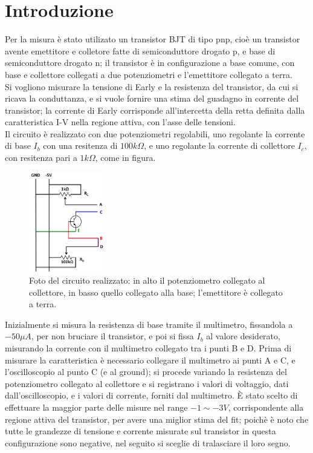 \documentclass{article}
\begin{document}
\section{Introduzione}
Per la misura è stato utilizato un transistor BJT di tipo pnp, cioè un transistor avente emettitore e colletore fatte di semiconduttore drogato p, e base di semiconduttore drogato n; il transistor è in configurazione a base comune, con base
e collettore collegati a due potenziometri e l'emettitore collegato a terra.\\
Si vogliono misurare la tensione di Early e la resistenza del transistor, da cui si ricava la conduttanza, e si vuole fornire una stima del guadagno in corrente del transistor;
la corrente di Early corrisponde all'intercetta della retta definita dalla caratteristica I-V nella regione attiva, con l'asse delle tensioni.\\
Il circuito è realizzato con due potenziometri regolabili, uno regolante la corrente di base $I_b$ con una resitenza di $100k\Omega$, e uno regolante
la corrente di collettore $I_c$, con resitenza pari a $1k\Omega$, come in figura.
\begin{figure}[H]
    \centering
    \includegraphics[width=0.3\textwidth]{circuito.jpg}
    \caption{\centering\label{fig:circuito}Foto del circuito realizzato: in alto il potenziometro collegato al collettore, in basso quello collegato alla base; l'emettitore è collegato a terra.}
\end{figure}
Inizialmente si misura la resistenza di base tramite il multimetro, fissandola a $-50 \mu A$, per non bruciare il transistor, e poi si fissa $I_b$ al valore desiderato, misurando la corrente con il multimetro collegato tra i punti B e D.
Prima di misurare la caratteristica è necessario collegare il multimetro ai punti A e C, e l'oscilloscopio al punto C (e al ground); si procede variando la resistenza del potenziometro collegato al collettore e si registrano i valori di voltaggio, dati dall'oscilloscopio, e i valori di corrente, forniti dal multimetro.
È stato scelto di effettuare la maggior parte delle misure nel range $-1 \sim -3 V$, corrispondente alla regione attiva del transistor, per avere una miglior stima del fit; poichè è noto che tutte le grandezze di tensione e corrente misurate sul transistor in questa configurazione sono negative, nel seguito si sceglie di tralasciare il loro segno.
\end{document}
